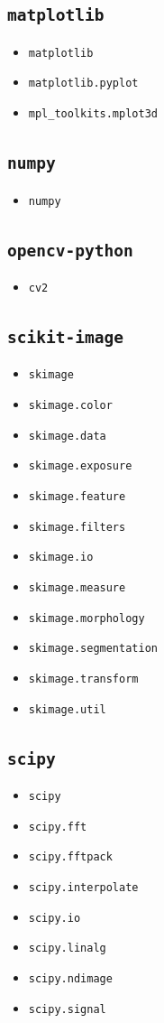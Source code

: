\documentclass[11pt]{article}
\begin{document}
\subsection*{\texttt{matplotlib}}
\begin{itemize}[leftmargin=1.5em]
\item \texttt{matplotlib}
\item \texttt{matplotlib.pyplot}
\item \texttt{mpl\_toolkits.mplot3d}
\end{itemize}
\subsection*{\texttt{numpy}}
\begin{itemize}[leftmargin=1.5em]
\item \texttt{numpy}
\end{itemize}
\subsection*{\texttt{opencv-python}}
\begin{itemize}[leftmargin=1.5em]
\item \texttt{cv2}
\end{itemize}
\subsection*{\texttt{scikit-image}}
\begin{itemize}[leftmargin=1.5em]
\item \texttt{skimage}
\item \texttt{skimage.color}
\item \texttt{skimage.data}
\item \texttt{skimage.exposure}
\item \texttt{skimage.feature}
\item \texttt{skimage.filters}
\item \texttt{skimage.io}
\item \texttt{skimage.measure}
\item \texttt{skimage.morphology}
\item \texttt{skimage.segmentation}
\item \texttt{skimage.transform}
\item \texttt{skimage.util}
\end{itemize}
\subsection*{\texttt{scipy}}
\begin{itemize}[leftmargin=1.5em]
\item \texttt{scipy}
\item \texttt{scipy.fft}
\item \texttt{scipy.fftpack}
\item \texttt{scipy.interpolate}
\item \texttt{scipy.io}
\item \texttt{scipy.linalg}
\item \texttt{scipy.ndimage}
\item \texttt{scipy.signal}
\end{itemize}
\end{document}
